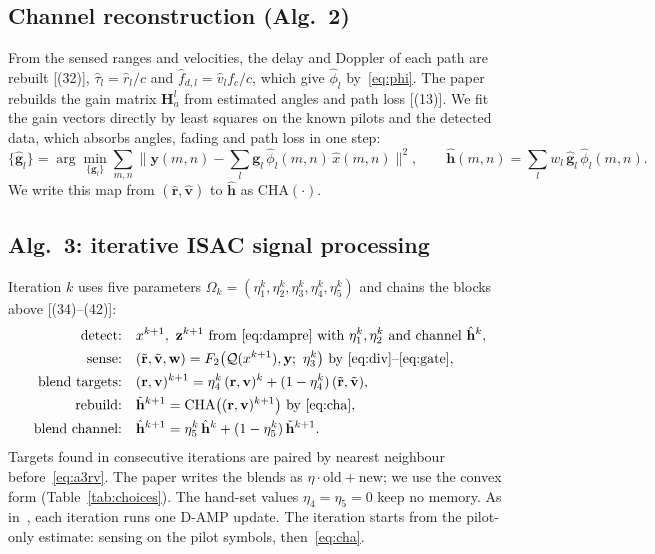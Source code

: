 \documentclass[11pt,a4paper]{article}
\newcommand{\BH}{\mathbf{H}}
\begin{document}
\subsection{Channel reconstruction (Alg.~2)}
From the sensed ranges and velocities, the delay and Doppler of each path are rebuilt [(32)], $\hat\tau_l=\hat r_l/c$ and $\hat f_{d,l}=\hat v_lf_c/c$, which give $\hat\phi_l$ by~\eqref{eq:phi}. The paper rebuilds the gain matrix $\BH_a^l$ from estimated angles and path loss [(13)]. We fit the gain vectors directly by least squares on the known pilots and the detected data, which absorbs angles, fading and path loss in one step:
\begin{equation}
  \{\hat{\mathbf{g}}_l\}=\arg\min_{\{\mathbf{g}_l\}}\sum_{m,n}\Big\|\mathbf{y}(m,n)-\sum_l\mathbf{g}_l\,\hat\phi_l(m,n)\,\hat{x}(m,n)\Big\|^2,\qquad
  \hat{\mathbf{h}}(m,n)=\sum_l w_l\,\hat{\mathbf{g}}_l\,\hat\phi_l(m,n).
\label{eq:cha}
\end{equation}
We write this map from $(\hat{\mathbf{r}},\hat{\mathbf{v}})$ to $\hat{\mathbf{h}}$ as $\mathrm{CHA}(\cdot)$.

\subsection{Alg.~3: iterative ISAC signal processing}
Iteration $k$ uses five parameters $\Omega_k=(\eta_1^k,\eta_2^k,\eta_3^k,\eta_4^k,\eta_5^k)$ and chains the blocks above [(34)--(42)]:
\begin{align}
  \text{detect:}\quad & x^{k+1},\ \mathbf{z}^{k+1}\ \text{from~\eqref{eq:dampre} with } \eta_1^k,\eta_2^k \text{ and channel } \hat{\mathbf{h}}^k,\label{eq:a3det}\\
  \text{sense:}\quad & (\tilde{\mathbf{r}},\tilde{\mathbf{v}},\mathbf{w})=F_2\big(\mathcal{Q}(x^{k+1}),\mathbf{y};\ \eta_3^k\big)\ \text{by~\eqref{eq:div}--\eqref{eq:gate}},\label{eq:a3sense}\\
  \text{blend targets:}\quad & (\mathbf{r},\mathbf{v})^{k+1}=\eta_4^k\,(\mathbf{r},\mathbf{v})^{k}+(1-\eta_4^k)\,(\tilde{\mathbf{r}},\tilde{\mathbf{v}}),\label{eq:a3rv}\\
  \text{rebuild:}\quad & \tilde{\mathbf{h}}^{k+1}=\mathrm{CHA}\big((\mathbf{r},\mathbf{v})^{k+1}\big)\ \text{by~\eqref{eq:cha}},\label{eq:a3cha}\\
  \text{blend channel:}\quad & \hat{\mathbf{h}}^{k+1}=\eta_5^k\,\hat{\mathbf{h}}^{k}+(1-\eta_5^k)\,\tilde{\mathbf{h}}^{k+1}.\label{eq:a3h}
\end{align}
Targets found in consecutive iterations are paired by nearest neighbour before~\eqref{eq:a3rv}. The paper writes the blends as $\eta\cdot\text{old}+\text{new}$; we use the convex form (Table~\ref{tab:choices}). The hand-set values $\eta_4=\eta_5=0$ keep no memory. As in~\cite{isacnet}, each iteration runs one D-AMP update. The iteration starts from the pilot-only estimate: sensing on the pilot symbols, then~\eqref{eq:cha}.
\end{document}
